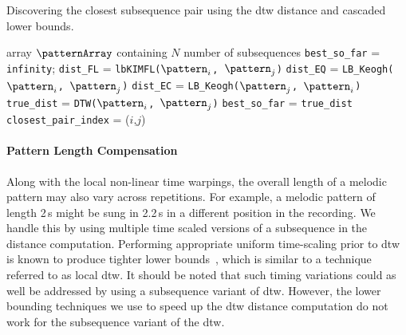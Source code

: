 \renewcommand{\algorithmiccomment}[1]{\bgroup\hfill\tiny//~#1\egroup}
\begin{algorithm}
\caption{Discovering the closest subsequence pair using the \gls{dtw} distance and cascaded lower bounds.}
\label{alg:algorithmdiscovery}
	\begin{algorithmic} 
	
	 array $\patternArray$ containing $N$ number of subsequences
	\State \texttt{best\_so\_far} = \texttt{infinity};
			\State  \texttt{dist\_FL} = \texttt{\acrshort{lbKIMFL}($\pattern_i$, $\pattern_j$)}			
				\State  \texttt{dist\_EQ} = \texttt{LB\_Keogh($\pattern_i$, $\pattern_j$)}				
					\State  \texttt{dist\_EC} = \texttt{LB\_Keogh($\pattern_j$, $\pattern_i$)}					
						\State  \texttt{true\_dist} = \texttt{DTW($\pattern_i$, $\pattern_j$)}						
							\State \texttt{best\_so\_far} = \texttt{true\_dist}
							\State \texttt{closest\_pair\_index} = ($i$,$j$)							
						\EndIf
					\EndIf
				\EndIf
			\EndIf
		\EndFor
	\EndFor
	
	\end{algorithmic}
\end{algorithm}
				

\paragraph{Pattern Length Compensation}
\label{PatternLengthCompensation}

Along with the local non-linear time warpings, the overall length of a melodic pattern may also vary across repetitions. For example, a melodic pattern of length 2\,s might be sung in 2.2\,s in a different position in the recording. We handle this by using multiple time scaled versions of a subsequence in the distance computation. 
Performing appropriate uniform time-scaling prior to \gls{dtw} is known to produce tighter lower bounds~\citep{Zhu2003}, which is similar to a technique referred to as local \gls{dtw}. It should be noted that such timing variations could as well be addressed by using a subsequence variant of \gls{dtw}. However, the lower bounding techniques we use to speed up the \gls{dtw} distance computation do not work for the subsequence variant of the \gls{dtw}. 

